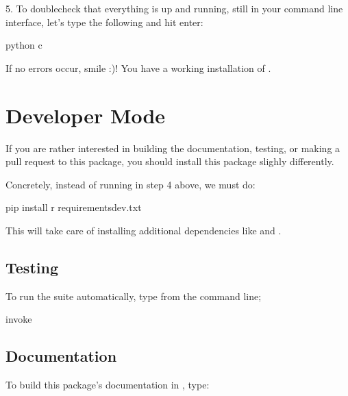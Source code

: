 \documentclass[letterpaper,10pt,english]{sphinxmanual}
\begin{document}
5. To double\sphinxhyphen{}check that everything is up and running, still in your command line
interface, let’s type the following and hit enter:

\begin{sphinxVerbatim}[commandchars=\\\{\}]
python \PYGZhy{}c 
\end{sphinxVerbatim}

If no errors occur, smile :)! You have a working installation of
.


\section{Developer Mode}
\label{\detokenize{gettingstarted:developer-mode}}
If you are rather interested in building the documentation, testing, or making a
pull request to this package, you should install this package slighly differently.

Concretely, instead of running  in step 4 above, we must do:

\begin{sphinxVerbatim}[commandchars=\\\{\}]
pip install \PYGZhy{}r requirements\PYGZhy{}dev.txt
\end{sphinxVerbatim}

This will take care of installing additional dependencies like  and .


\subsection{Testing}
\label{\detokenize{gettingstarted:testing}}
To run the  suite automatically, type from the command line;

\begin{sphinxVerbatim}[commandchars=\\\{\}]
invoke 
\end{sphinxVerbatim}


\subsection{Documentation}
\label{\detokenize{gettingstarted:documentation}}
To build this package’s documentation in , type:
\end{document}

